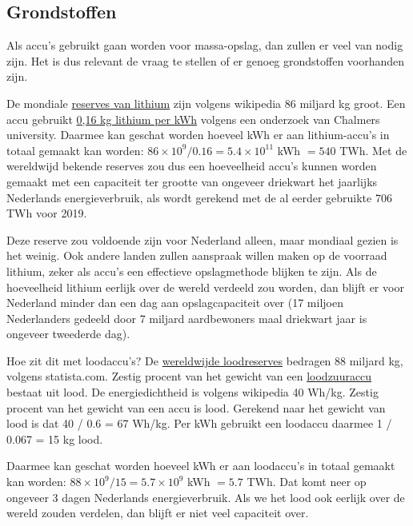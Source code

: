 \documentclass[
  11pt,
  a4paper,
]{book}
\begin{document}
\hypertarget{grondstoffen}{%
\subsection{Grondstoffen}\label{grondstoffen}}

Als accu's gebruikt gaan worden voor massa-opslag, dan zullen er veel van nodig zijn. Het is dus relevant de vraag te stellen of er genoeg grondstoffen voorhanden zijn.

De mondiale \href{https://en.wikipedia.org/wiki/Lithium\#Reserves}{reserves van lithium} zijn volgens wikipedia 86 miljard kg groot. Een accu gebruikt \href{https://publications.lib.chalmers.se/records/fulltext/230991/local_230991.pdf}{0,16 kg lithium per kWh} volgens een onderzoek van Chalmers university. Daarmee kan geschat worden hoeveel kWh er aan lithium-accu's in totaal gemaakt kan worden: \(86 \times 10^9 / 0.16 = 5.4 \times 10^{11}\) kWh \(= 540\) TWh. Met de wereldwijd bekende reserves zou dus een hoeveelheid accu's kunnen worden gemaakt met een capaciteit ter grootte van ongeveer driekwart het jaarlijks Nederlands energieverbruik, als wordt gerekend met de al eerder gebruikte 706 TWh voor 2019.

Deze reserve zou voldoende zijn voor Nederland alleen, maar mondiaal gezien is het weinig. Ook andere landen zullen aanspraak willen maken op de voorraad lithium, zeker als accu's een effectieve opslagmethode blijken te zijn. Als de hoeveelheid lithium eerlijk over de wereld verdeeld zou worden, dan blijft er voor Nederland minder dan een dag aan opslagcapaciteit over (17 miljoen Nederlanders gedeeld door 7 miljard aardbewoners maal driekwart jaar is ongeveer tweederde dag).

Hoe zit dit met loodaccu's? De \href{https://www.statista.com/statistics/1156095/global-lead-reserves/}{wereldwijde loodreserves} bedragen 88 miljard kg, volgens statista.com. Zestig procent van het gewicht van een \href{https://en.wikipedia.org/wiki/Lead\%E2\%80\%93acid_battery}{loodzuuraccu} bestaat uit lood. De energiedichtheid is volgens wikipedia 40 Wh/kg. Zestig procent van het gewicht van een accu is lood. Gerekend naar het gewicht van lood is dat 40 / 0.6 = 67 Wh/kg. Per kWh gebruikt een loodaccu daarmee 1 / 0.067 = 15 kg lood.

Daarmee kan geschat worden hoeveel kWh er aan loodaccu's in totaal gemaakt kan worden: \(88 \times 10^9 / 15 = 5.7 \times 10^{9}\) kWh \(= 5.7\) TWh. Dat komt neer op ongeveer 3 dagen Nederlands energieverbruik. Als we het lood ook eerlijk over de wereld zouden verdelen, dan blijft er niet veel capaciteit over.
\end{document}
